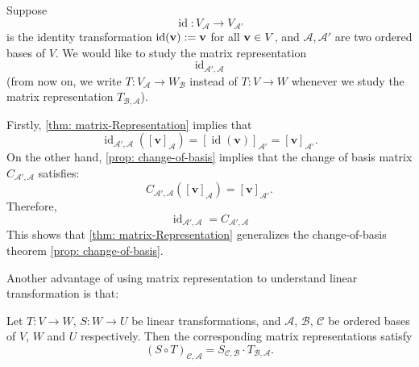\begin{remark} \label{rmk:changeofbasis_matrixtrans}
Suppose 
\[ \operatorname{id}: V_{\mathcal{A}} \to V_{\mathcal{A}'}\]
is the identity transformation $\operatorname{id}({\bf v}) := {\bf v}$ for all ${\bf v} \in V$, and \( \mathcal{A}, \mathcal{A}' \) are two ordered bases of \( V \). We would like to study
the matrix representation 
$$\operatorname{id}_{\mathcal{A}',\mathcal{A}}$$
(from now on, we write $T: V_{\mathcal{A}} \to W_{\mathcal{B}}$ instead of $T:V \to W$ whenever we study the matrix representation $T_{\mathcal{B},\mathcal{A}}$). 

Firstly, \autoref{thm: matrix-Representation} implies that
\[
\operatorname{id}_{\mathcal{A}', \mathcal{A}} ([\mathbf{v}]_{\mathcal{A}}) = [\operatorname{id}(\mathbf{v})]_{\mathcal{A}'} = [\mathbf{v}]_{\mathcal{A}'}.
\]
On the other hand, \autoref{prop: change-of-basis} implies that the change of basis matrix $C_{\mathcal{A}', \mathcal{A}}$ satisfies:
\[
C_{\mathcal{A}', \mathcal{A}} ([\mathbf{v}]_{\mathcal{A}}) = [\mathbf{v}]_{\mathcal{A}'}.
\]
Therefore, 
\[ \operatorname{id}_{\mathcal{A}', \mathcal{A}} = C_{\mathcal{A}', \mathcal{A}} \] 
This shows that \autoref{thm: matrix-Representation} generalizes the change-of-basis theorem \autoref{prop: change-of-basis}.
\end{remark}

Another advantage of using matrix representation to understand linear transformation is that:
\begin{center}
\end{center}
\begin{proposition}[Functoriality] \label{prop:functoriality}
Let \( T : V \to W \), $S: W \to U$ be linear transformations, and $\mathcal{A}$, $\mathcal{B}$, $\mathcal{C}$ be ordered bases of $V$, $W$ and $U$ respectively. Then the corresponding matrix representations satisfy
\begin{equation}\label{eq:change-of-basis-matrix}
(S \circ T)_{\mathcal{C}, \mathcal{A}} = S_{\mathcal{C}, \mathcal{B}} \cdot T_{\mathcal{B}, \mathcal{A}}.
\end{equation}
\end{proposition}

